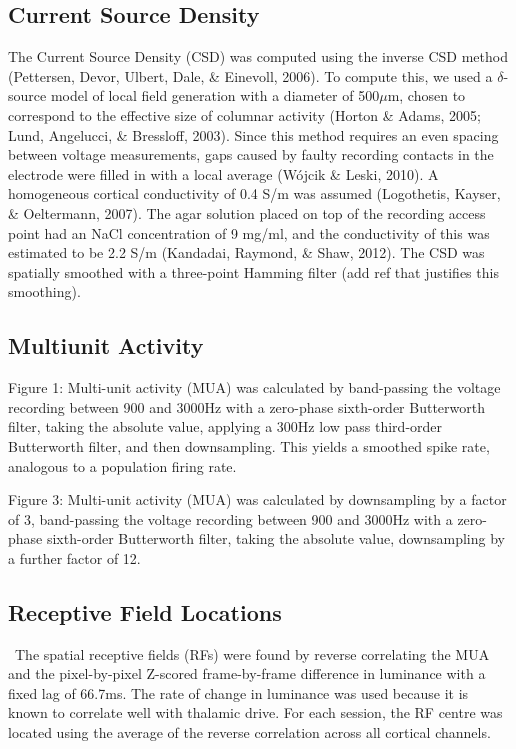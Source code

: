 \subsection[Current Source Density]{Current Source Density}
The Current Source Density (CSD) was computed using the inverse CSD method (Pettersen, Devor, Ulbert, Dale, \& Einevoll, 2006). To compute this, we used a $\delta$-source model of local field generation with a diameter of 500$\mu$m, chosen to correspond to the effective size of columnar activity (Horton \& Adams, 2005; Lund, Angelucci, \& Bressloff, 2003). Since this method requires an even spacing between voltage measurements, gaps caused by faulty recording contacts in the electrode were filled in with a local average (W\'ojcik \& Leski, 2010). A homogeneous cortical conductivity of 0.4 S/m was assumed (Logothetis, Kayser, \& Oeltermann, 2007). The agar solution placed on top of the recording access point had an NaCl concentration of 9 mg/ml, and the conductivity of this was estimated to be 2.2 S/m (Kandadai, Raymond, \& Shaw, 2012). The CSD was spatially smoothed with a three-point Hamming filter (add ref that justifies this smoothing).

\subsection{Multiunit Activity }
Figure 1: Multi-unit activity (MUA) was calculated by band-passing the voltage recording between 900 and 3000Hz with a zero-phase sixth-order Butterworth filter, taking the absolute value, applying a 300Hz low pass third-order Butterworth filter, and then downsampling. This yields a smoothed spike rate, analogous to a population firing rate.

Figure 3: Multi-unit activity (MUA) was calculated by downsampling by a factor of 3, band-passing the voltage recording between 900 and 3000Hz with a zero-phase sixth-order Butterworth filter, taking the absolute value, downsampling by a further factor of 12.

\subsection{Receptive Field Locations}
\ The spatial receptive fields (RFs) were found by reverse correlating the MUA and the pixel-by-pixel Z-scored frame-by-frame difference in luminance with a fixed lag of 66.7ms. The rate of change in luminance was used because it is known to correlate well with thalamic drive. For each session, the RF centre was located using the average of the reverse correlation across all cortical channels.

